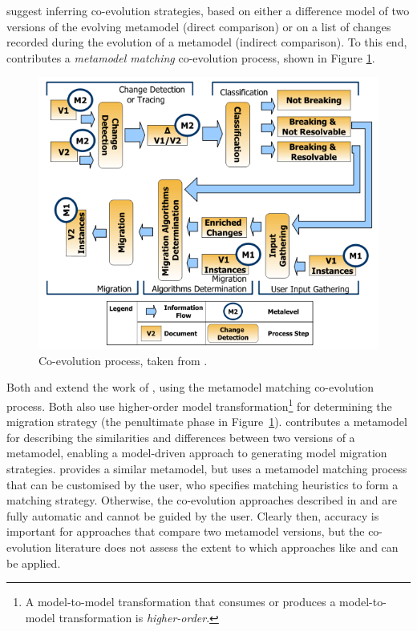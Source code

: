 \cite{gruschko07towards} suggest inferring co-evolution strategies, based on either a difference model of two versions of the evolving metamodel (direct comparison) or on a list of changes recorded during the evolution of a metamodel (indirect comparison). To this end, \cite{gruschko07towards} contributes a \emph{metamodel matching} co-evolution process, shown in Figure \ref{fig:coevoprocess}. 

\begin{figure}[htbp]
  \begin{center}
    \leavevmode
    \includegraphics[scale=0.6]{3.LiteratureReview/images/CoEvoProcess.png}
  \end{center}
  \caption{Co-evolution process, taken from \cite{gruschko07towards}.}
  \label{fig:coevoprocess}
\end{figure}

Both \cite{cicchetti08automating} and \cite{garces09managing} extend the work of \cite{gruschko07towards}, using the metamodel matching co-evolution process. Both also use higher-order model transformation\footnote{A model-to-model transformation that consumes or produces a model-to-model transformation is \emph{higher-order}.} for determining the migration strategy (the penultimate phase in Figure~\ref{fig:coevoprocess}). \cite{cicchetti08automating} contributes a metamodel for  describing the similarities and differences between two versions of a metamodel, enabling a model-driven approach to generating model migration strategies. \cite{garces09managing} provides a similar metamodel, but uses a metamodel matching process that can be customised by the user, who specifies matching heuristics to form a matching strategy. Otherwise, the co-evolution approaches described in \cite{cicchetti08automating} and \cite{garces09managing} are fully automatic and cannot be guided by the user. Clearly then, accuracy is important for approaches that compare two metamodel versions, but the co-evolution literature does not assess the extent to which approaches like \cite{cicchetti08automating} and \cite{garces09managing} can be applied.

